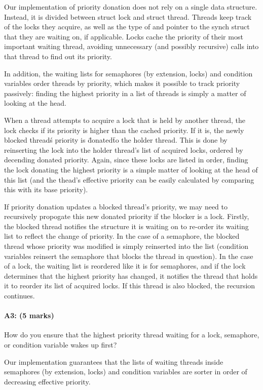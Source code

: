 Our implementation of priority donation does not rely on a single data structure. Instead, it is divided between struct lock and struct thread. Threads keep track of the locks they acquire, as well as the type of and pointer to the synch struct that they are waiting on, if applicable. Locks cache the priority of their most important waiting thread, avoiding unnecessary (and possibly recursive) calls into that thread to find out its priority.

In addition, the waiting lists for semaphores (by extension, locks) and condition variables order threads by priority, which makes it possible to track priority passively: finding the highest priority in a list of threads is simply a matter of looking at the head.

When a thread attempts to acquire a lock that is held by another thread, the lock checks if its priority is higher than the cached priority. If it is, the newly blocked thread\'s priority is \"donated\" to the holder thread. This is done by reinserting the lock into the holder thread's list of acquired locks, ordered by decending donated priority. Again, since these locks are listed in order, finding the lock donating the highest priority is a simple matter of looking at the head of this list (and the thead's effective priority can be easily calculated by comparing this with its base priority).

If priority donation updates a blocked thread's priority, we may need to recursively propogate this new donated priority if the blocker is a lock. Firstly, the blocked thread notifies the structure it is waiting on to re-order its waiting list to reflect the change of priority.
In the case of a semaphore, the blocked thread whose priority was modified is simply reinserted into the list (condition variables reinsert the semaphore that blocks the thread in question).
In the case of a lock, the waiting list is reordered like it is for semaphores, and if the lock determines that the highest priority has changed, it notifies the thread that holds it to reorder its list of acquired locks. If this thread is also blocked, the recursion continues.

\paragraph{A3: (5 marks)}
How do you ensure that the highest priority thread waiting for a lock, semaphore, or condition variable wakes up first?

Our implementation guarantees that the lists of waiting threads inside semaphores (by extension, locks) and condition variables are sorter in order of decreasing effective priority.

